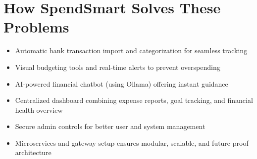 \documentclass{article}
\begin{document}
\section{How SpendSmart Solves These Problems}
\begin{itemize}
    \item Automatic bank transaction import and categorization for seamless tracking
    \item Visual budgeting tools and real-time alerts to prevent overspending
    \item AI-powered financial chatbot (using Ollama) offering instant guidance
    \item Centralized dashboard combining expense reports, goal tracking, and financial health overview
    \item Secure admin controls for better user and system management
    \item Microservices and gateway setup ensures modular, scalable, and future-proof architecture
\end{itemize}
\end{document}
